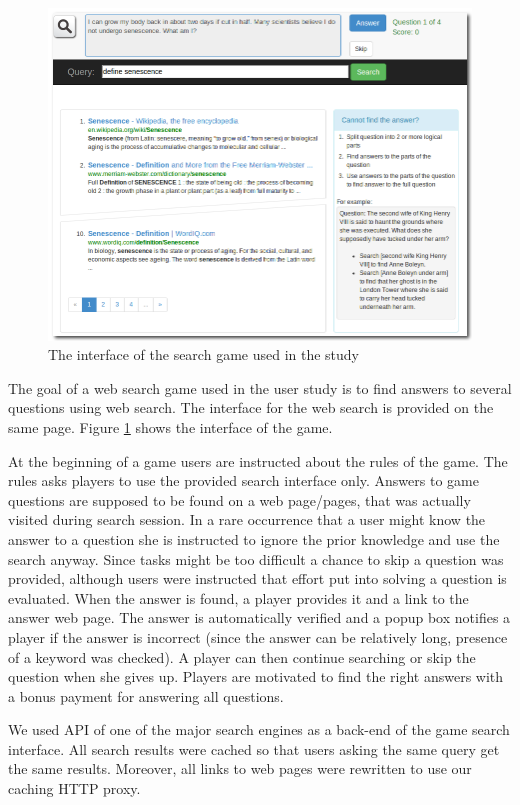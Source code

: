 \documentclass{sig-alternate}
\begin{document}
\begin{figure}
\centering
\includegraphics[scale=0.29]{img/ufindit}
\caption{The interface of the search game used in the study}
\label{figure:ufindit}
\end{figure}

The goal of a web search game used in the user study is to find answers to several questions using web search.
The interface for the web search is provided on the same page.
Figure \ref{figure:ufindit} shows the interface of the game.

At the beginning of a game users are instructed about the rules of the game.
The rules asks players to use the provided search interface only.
Answers to game questions are supposed to be found on a web page/pages, that was actually visited during search session.
In a rare occurrence that a user might know the answer to a question she is instructed to ignore the prior knowledge and use the search anyway.
Since tasks might be too difficult a chance to skip a question was provided, although users were instructed that effort put into solving a question is evaluated.
When the answer is found, a player provides it and a link to the answer web page.
The answer is automatically verified and a popup box notifies a player if the answer is incorrect (since the answer can be relatively long, presence of a keyword was checked).
A player can then continue searching or skip the question when she gives up.
Players are motivated to find the right answers with a bonus payment for answering all questions.

We used API of one of the major search engines as a back-end of the game search interface.
All search results were cached so that users asking the same query get the same results.
Moreover, all links to web pages were rewritten to use our caching HTTP proxy.
\end{document}
